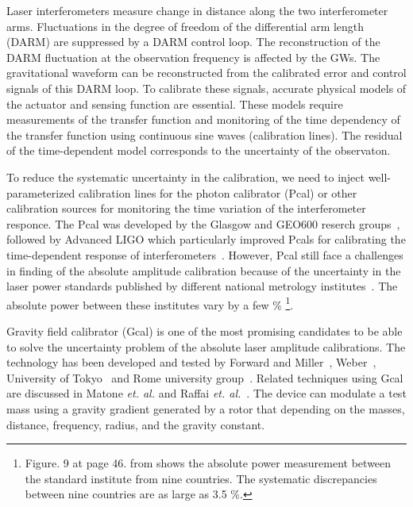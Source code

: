 \documentclass[%
 reprint,
superscriptaddress,
 amsmath,amssymb,
 aps,
]{revtex4-1}
\begin{document}
Laser interferometers measure change in distance along the two interferometer arms. Fluctuations in the degree of freedom of the differential arm length (DARM) are suppressed by a DARM control loop. The reconstruction of the DARM fluctuation at the observation frequency is affected by the GWs. The gravitational waveform can be reconstructed from the calibrated error and control signals of this DARM loop. To calibrate these signals, accurate physical models of the actuator and sensing function are essential. These models require measurements of the transfer function and monitoring of the time dependency of the transfer function using continuous sine waves (calibration lines). The residual of the time-dependent model corresponds to the uncertainty of the observaton.

To reduce the systematic uncertainty in the calibration, we need to inject well-parameterized calibration lines for the photon calibrator (Pcal) or other calibration sources for monitoring the time variation of the interferometer responce. The Pcal was developed by the Glasgow and GEO600 reserch groups~\cite{CLUBLEY200185,MOSSAVI20061}, followed by Advanced LIGO which particularly improved Pcals for calibrating the time-dependent response of interferometers~\cite{0264-9381-32-2-024001, doi:10.1063/1.4967303,0264-9381-27-8-084024,0264-9381-26-24-245011,0264-9381-32-2-024001}. However, Pcal still face a challenges in finding of the absolute amplitude calibration because of the uncertainty in the laser power standards published by different national metrology institutes~\cite{EUROMET}. The absolute power between these institutes vary by a few \% \footnote{Figure. 9 at page 46. from \cite{EUROMET} shows the absolute power measurement between the standard institute from nine countries. The systematic discrepancies between nine countries are as large as 3.5 \%.}.

Gravity field calibrator (Gcal) is one of the most promising candidates to be able to solve the uncertainty problem of the absolute laser amplitude calibrations. The technology has been developed and tested by Forward and Miller~\cite{doi:10.1063/1.1709366}, Weber~\cite{PhysRevLett.18.795,PhysRev.167.1145}, University of Tokyo~\cite{Hirakawa,1347-4065-19-3-L123,1347-4065-20-7-L498,PhysRevD.26.729,PhysRevD.32.342} and Rome university group~\cite{Astone1991, Astone1998}. Related techniques using Gcal are discussed in Matone {\it et. al.} and Raffai {\it et. al.}~\cite{0264-9381-24-9-005, PhysRevD.84.082002}. The device can modulate a test mass using a gravity gradient generated by a rotor that depending on the masses, distance, frequency, radius, and the gravity constant. 
\end{document}
